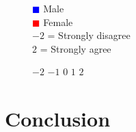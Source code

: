 \documentclass{beamer}              %
\begin{document}
\begin{frame}
\begin{figure}
\begin{columns}
  \caption*{ \hspace{0.8cm} \textcolor{blue}{$\blacksquare$} Male\\ \hspace{0.8cm} \textcolor{red}{$\blacksquare$} Female
  \\ \vspace{0.2cm} \hspace{0.8cm} $-2$ = Strongly disagree  \\ \hspace{1.1cm} $2$ = Strongly agree}
\vspace{-1cm}        
   \vspace{-0.2cm}     \hspace{-0.8cm} 
  \caption*{\footnotesize \hspace{-1.6cm}$-2$ \hspace{0.5cm}$-1$ \hspace{0.5cm}$0$ \hspace{0.5cm}$1$ \hspace{0.5cm}$2$  }
      \end{columns}
    \end{figure}




\end{frame}








\section{Conclusion}
\end{document}
